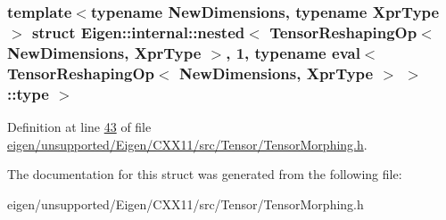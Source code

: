 \subsubsection*{template$<$typename New\+Dimensions, typename Xpr\+Type$>$\newline
struct Eigen\+::internal\+::nested$<$ Tensor\+Reshaping\+Op$<$ New\+Dimensions, Xpr\+Type $>$, 1, typename eval$<$ Tensor\+Reshaping\+Op$<$ New\+Dimensions, Xpr\+Type $>$ $>$\+::type $>$}



Definition at line \hyperlink{eigen_2unsupported_2_eigen_2_c_x_x11_2src_2_tensor_2_tensor_morphing_8h_source_l00043}{43} of file \hyperlink{eigen_2unsupported_2_eigen_2_c_x_x11_2src_2_tensor_2_tensor_morphing_8h_source}{eigen/unsupported/\+Eigen/\+C\+X\+X11/src/\+Tensor/\+Tensor\+Morphing.\+h}.



The documentation for this struct was generated from the following file\+:\begin{DoxyCompactItemize}
\item 
eigen/unsupported/\+Eigen/\+C\+X\+X11/src/\+Tensor/\+Tensor\+Morphing.\+h\end{DoxyCompactItemize}
